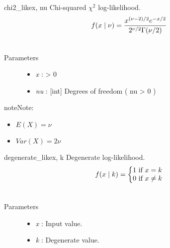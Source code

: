 \hypertarget{pymc.distributions.chi2_like}{}\begin{funcdesc}{chi2\_like}{x, nu}
Chi-squared $\chi^2$ log-likelihood.
\begin{gather}
\begin{split}f(x \mid \nu) = \frac{x^{(\nu-2)/2}e^{-x/2}}{2^{\nu/2}\Gamma(\nu/2)}\end{split}\notag\\\begin{split}\end{split}\notag
\end{gather}\begin{description}
\item[Parameters] \leavevmode\begin{itemize}
\item {} 
\emph{x} : \textgreater{} 0

\item {} 
\emph{nu} : {[}int{]} Degrees of freedom ( nu \textgreater{} 0 )

\end{itemize}

\end{description}

\begin{notice}{note}{Note:}\begin{itemize}
\item {} 
$E(X)=\nu$

\item {} 
$Var(X)=2\nu$

\end{itemize}
\end{notice}
\end{funcdesc}

\hypertarget{pymc.distributions.degenerate_like}{}\begin{funcdesc}{degenerate\_like}{x, k}
Degenerate log-likelihood.
\begin{gather}
\begin{split}f(x \mid k) = \left\{ \begin{matrix} 1 \text{ if } x = k \\ 0 \text{ if } x \ne k\end{matrix} \right.\end{split}\notag\\\begin{split}\end{split}\notag
\end{gather}\begin{description}
\item[Parameters] \leavevmode\begin{itemize}
\item {} 
\emph{x} : Input value.

\item {} 
\emph{k} : Degenerate value.

\end{itemize}

\end{description}
\end{funcdesc}

